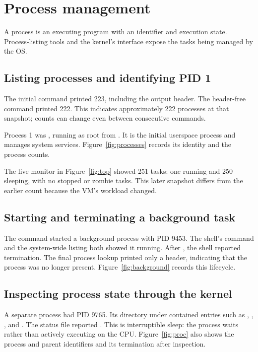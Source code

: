 \documentclass{../latex/utmreport}
\begin{document}
\chapter{Process management}
A process is an executing program with an identifier and execution state.
Process-listing tools and the kernel's  interface expose the
tasks being managed by the OS.

\section{Listing processes and identifying PID 1}
The initial  command printed 223, including the output
header. The header-free command  printed
222. This indicates approximately 222 processes at that snapshot; counts can
change even between consecutive commands.

Process 1 was , running as root from
. It is the initial userspace process and
manages system services. Figure~\ref{fig:processes} records its identity and
the process counts.

The live monitor in Figure~\ref{fig:top} showed 251 tasks: one running and
250 sleeping, with no stopped or zombie tasks. This later snapshot differs
from the earlier  count because the VM's workload changed.

\section{Starting and terminating a background task}
The command  started a background process with PID 9453.
The shell's  command and the system-wide  listing both
showed it running. After , the shell reported termination.
The final process lookup printed only a header, indicating that the process
was no longer present. Figure~\ref{fig:background} records this lifecycle.

\section{Inspecting process state through the kernel}
A separate  process had PID 9765. Its directory under
 contained entries such as , ,
, and . The status file reported
. This is interruptible sleep: the process waits
rather than actively executing on the CPU. Figure~\ref{fig:proc} also shows
the process and parent identifiers and its termination after inspection.
\end{document}
